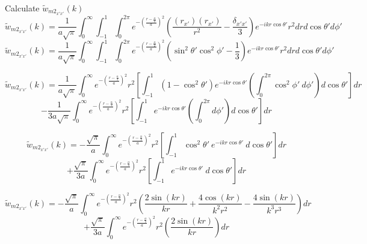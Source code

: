 \documentclass[double,12pt]{beavtex}
\begin{document}
Calculate $\widetilde{w}_{{m2}_{x'x'}}(k)$ 
\begin{equation}{\widetilde{w}_{{m2}_{x'x'}}(k)=\frac{1}{a\sqrt{\pi}}\int_{0}^{\infty}\int_{-1}^{1}\int_{0}^{2\pi}e^{-\left(\frac{r-\frac{\alpha}{2}}{a}\right)^2}\left(\frac{(r_{x'})(r_{x'})}{r^2}-\frac{\delta_{x'x'}}{3}\right)e^{-ikr\cos\theta'}r^2d{r}d{\cos\theta'}d{\phi'}}\end{equation}
\begin{equation}{\widetilde{w}_{{m2}_{x'x'}}(k)=\frac{1}{a\sqrt{\pi}}\int_{0}^{\infty}\int_{-1}^{1}\int_{0}^{2\pi}e^{-\left(\frac{r-\frac{\alpha}{2}}{a}\right)^2}\left(\sin^2\theta'\cos^2\phi'-\frac{1}{3}\right)e^{-ikr\cos\theta'}r^2d{r}d{\cos\theta'}d{\phi'}}\end{equation}

\begin{displaymath}{\widetilde{w}_{{m2}_{x'x'}}(k)=\frac{1}{a\sqrt{\pi}}\int_{0}^{\infty}e^{-\left(\frac{r-\frac{\alpha}{2}}{a}\right)^2}r^2\left[\int_{-1}^{1}\left(1-\cos^2\theta'\right)e^{-ikr\cos\theta'}\left(\int_{0}^{2\pi}\cos^2\phi'~d{\phi'}\right)d{\cos\theta'}\right]d{r}}\end{displaymath} 
\begin{equation}{-\frac{1}{3a\sqrt{\pi}}\int_{0}^{\infty}e^{-\left(\frac{r-\frac{\alpha}{2}}{a}\right)^2}r^2\left[\int_{-1}^{1}e^{-ikr\cos\theta'}\left(\int_{0}^{2\pi}d{\phi'}\right)d{\cos\theta'}\right]d{r}}\end{equation}

\begin{displaymath}{\widetilde{w}_{{m2}_{x'x'}}(k)=-\frac{\sqrt{\pi}}{a}\int_{0}^{\infty}e^{-\left(\frac{r-\frac{\alpha}{2}}{a}\right)^2}r^2\left[\int_{-1}^{1}\cos^2\theta'~e^{-ikr\cos\theta'}~d{\cos\theta'}\right]d{r}}\end{displaymath} 
\begin{equation}\label{compare_equation}{+\frac{\sqrt{\pi}}{3a}\int_{0}^{\infty}e^{-\left(\frac{r-\frac{\alpha}{2}}{a}\right)^2}r^2\left[\int_{-1}^{1}e^{-ikr\cos\theta'}~d{\cos\theta'}\right]d{r}}\end{equation}

\begin{displaymath}{\widetilde{w}_{{m2}_{x'x'}}(k)=-\frac{\sqrt{\pi}}{a}\int_{0}^{\infty}e^{-\left(\frac{r-\frac{\alpha}{2}}{a}\right)^2}r^2\left(\frac{2\sin(kr)}{kr}+\frac{4\cos(kr)}{k^2r^2}-\frac{4\sin(kr)}{k^3r^3}\right)d{r}}\end{displaymath} 
\begin{equation}{+\frac{\sqrt{\pi}}{3a}\int_{0}^{\infty}e^{-\left(\frac{r-\frac{\alpha}{2}}{a}\right)^2}r^2\left(\frac{2\sin(kr)}{kr}\right)d{r}}\end{equation}
\end{document}
